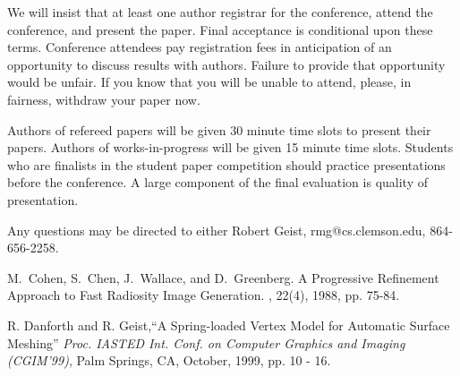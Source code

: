 \documentclass[twocolumn]{article}
\begin{document}
We will insist that at least one author registrar for the
conference, attend the conference, and present the paper.  Final
acceptance is conditional upon these terms.  Conference attendees
pay registration fees in anticipation of an opportunity to discuss
results with authors.  Failure to provide that opportunity would be
unfair.  If you know that you will be unable to attend, please, in
fairness, withdraw your paper now.

Authors of refereed papers will be given 30 minute time slots to
present their papers.  Authors of works-in-progress will be given
15 minute time slots.  Students who are finalists in the student
paper competition should practice presentations before the conference.
A large component of the final evaluation is quality of presentation.

Any questions may be directed to either Robert Geist, rmg@cs.clemson.edu, 
864-656-2258.

\begin{thebibliography}{1}

M.~Cohen, S.~Chen, J.~Wallace, and D.~Greenberg.
\newblock A Progressive Refinement Approach to Fast Radiosity Image Generation.
, 22(4), 1988, pp. 75-84.

R. Danforth and R. Geist,``A Spring-loaded Vertex Model for Automatic Surface
Meshing'' {\it Proc. IASTED Int. Conf. on Computer Graphics and Imaging
(CGIM'99)}, Palm Springs, CA, October, 1999, pp. 10 - 16.
\end{thebibliography}
\end{document}
